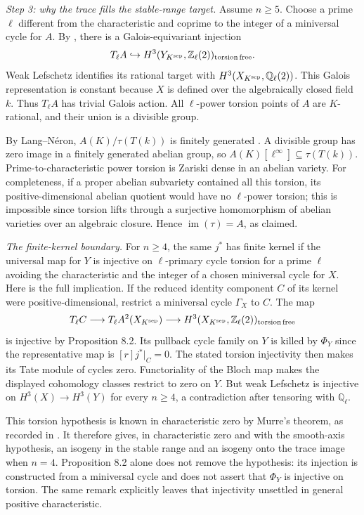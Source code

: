 \emph{Step 3: why the trace fills the stable-range target.}
Assume $n\geq5$. Choose a prime $\ell$ different from the
characteristic and coprime to the integer of a miniversal cycle
for $A$. By \cite[Proposition 8.2, p.~31]{DGJ_ACMVFunctor}, there
is a Galois-equivariant injection
\[
 T_\ell A\hookrightarrow H^3(Y_{K^{\rm sep}},\mathbb Z_\ell(2))_{
 \rm torsion\,free}.
\]
Weak Lefschetz identifies its rational target with
$H^3(X_{K^{\rm sep}},\mathbb Q_\ell(2))$. This Galois
representation is constant because $X$ is defined over the
algebraically closed field $k$. Thus $T_\ell A$ has trivial
Galois action. All $\ell$-power torsion points of $A$ are
$K$-rational, and their union is a divisible group.

By Lang--N\'eron,
$A(K)/\tau(T(k))$ is finitely generated
\cite[Theorem 7.1, p.~23]{DGJ_Conrad2006}. A divisible group
has zero image in a finitely generated abelian group, so
$A(K)[\ell^\infty]\subseteq\tau(T(k))$. Prime-to-characteristic
power torsion is Zariski dense in an abelian variety. For
completeness, if a proper abelian subvariety contained all this
torsion, its positive-dimensional abelian quotient would have
no $\ell$-power torsion; this is impossible since torsion lifts
through a surjective homomorphism of abelian varieties over an
algebraic closure. Hence $\operatorname{im}(\tau)=A$, as claimed.

\emph{The finite-kernel boundary.}
For $n\geq4$, the same $j^*$ has finite kernel if the universal
map for $Y$ is injective on $\ell$-primary cycle torsion for a
prime $\ell$ avoiding the characteristic and the integer of a
chosen miniversal cycle for $X$. Here is the full implication.
If the reduced identity component $C$ of its kernel were
positive-dimensional, restrict a miniversal cycle $\Gamma_X$
to $C$. The map
\[
 T_\ell C\longrightarrow T_\ell A^2(X_{K^{\rm sep}})
 \longrightarrow H^3(X_{K^{\rm sep}},\mathbb Z_\ell(2))_{
 \rm torsion\,free}
\]
is injective by Proposition 8.2. Its pullback cycle family on
$Y$ is killed by $\Phi_Y$ since the representative map is
$[r]j^*|_C=0$. The stated torsion injectivity then makes its
Tate module of cycles zero. Functoriality of the Bloch map
\cite[Section 8.1, pp.~30--31]{DGJ_ACMVFunctor} makes the
displayed cohomology classes restrict to zero on $Y$. But weak
Lefschetz is injective on $H^3(X)\to H^3(Y)$ for every $n\geq4$,
a contradiction after tensoring with $\mathbb Q_\ell$.

This torsion hypothesis is known in characteristic zero by
Murre's theorem, as recorded in
\cite[Remark 8.6, p.~33]{DGJ_ACMVFunctor}. It therefore gives,
in characteristic zero and with the smooth-axis hypothesis,
an isogeny in the stable range and an isogeny onto the trace
image when $n=4$. Proposition 8.2 alone does not remove the
hypothesis: its injection is constructed from a miniversal
cycle and does not assert that $\Phi_Y$ is injective on torsion.
The same remark explicitly leaves that injectivity unsettled
in general positive characteristic.

